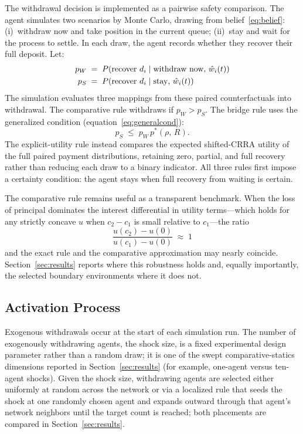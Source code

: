 \documentclass[12pt]{article}\usepackage[]{graphicx}\usepackage[]{xcolor}
\begin{document}
The withdrawal decision is implemented as a pairwise safety comparison.
The agent simulates two scenarios by Monte Carlo, drawing from belief~\eqref{eq:belief}: (i)~withdraw now and take position in the current queue; (ii)~stay and wait for the process to settle.
In each draw, the agent records whether they recover their full deposit.
Let:
%
\begin{align}
  p_W &\;=\; P(\text{recover } d_i \mid \text{withdraw now},\,
              \hat{w}_i(t)) \notag \\
  p_S &\;=\; P(\text{recover } d_i \mid \text{stay},\,
              \hat{w}_i(t)) \notag
\end{align}
%
The simulation evaluates three mappings from these paired counterfactuals into withdrawal.
The comparative rule withdraws if $p_W>p_S$.
The bridge rule uses the generalized condition (equation~\eqref{eq:generalcond}):
%
\[ p_S \;\leq\; p_W\,p^*(\rho,\,R). \]
%
The explicit-utility rule instead compares the expected shifted-CRRA utility of the full paired payment distributions, retaining zero, partial, and full recovery rather than reducing each draw to a binary indicator.
All three rules first impose a certainty condition: the agent stays when full recovery from waiting is certain.

The comparative rule remains useful as a transparent benchmark.
When the loss of principal dominates the interest differential in utility terms---which holds for any strictly concave $u$ when $c_2-c_1$ is small relative to $c_1$---the ratio
%
\[ \frac{u(c_2)-u(0)}{u(c_1)-u(0)} \;\approx\; 1 \]
%
and the exact rule and the comparative approximation may nearly coincide.
Section~\ref{sec:results} reports where this robustness holds and, equally importantly, the selected boundary environments where it does not.

\subsection{Activation Process}

Exogenous withdrawals occur at the start of each simulation run.
The number of exogenously withdrawing agents, the shock size, is a fixed experimental design parameter rather than a random draw; it is one of the swept comparative-statics dimensions reported in Section~\ref{sec:results} (for example, one-agent versus ten-agent shocks).
Given the shock size, withdrawing agents are selected either uniformly at random across the network or via a localized rule that seeds the shock at one randomly chosen agent and expands outward through that agent's network neighbors until the target count is reached; both placements are compared in Section~\ref{sec:results}.
\end{document}
